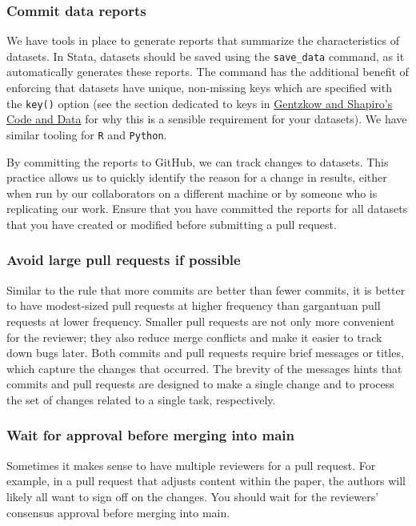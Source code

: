 \subsubsection{Commit data reports}
We have tools in place to generate reports that summarize the characteristics of datasets.
In Stata, datasets should be saved using the \texttt{save\_data} command,
as it automatically generates these reports.
The command has the additional benefit of enforcing that datasets have unique,
non-missing keys which are specified with the \texttt{key()} option
 (see the section dedicated to keys in \href{https://web.stanford.edu/~gentzkow/research/CodeAndData.pdf}{Gentzkow and Shapiro's Code and Data} for why this is a sensible requirement for your datasets).
We have similar tooling for \texttt{R} and \texttt{Python}.

By committing the reports to GitHub, we can track changes to datasets.
This practice allows us to quickly identify the reason for a change in results,
either when run by our collaborators on a different machine or by someone
who is replicating our work.
Ensure that you have committed the reports for all datasets
that you have created or modified before submitting a pull request.

\subsubsection{Avoid large pull requests if possible}
Similar to the rule that more commits are better than fewer commits,
it is better to have modest-sized pull requests at higher frequency
than gargantuan pull requests at lower frequency.
Smaller pull requests are not only more convenient for the reviewer;
they also reduce merge conflicts
and make it easier to track down bugs later.
Both commits and pull requests require brief messages or titles,
which capture the changes that occurred.
The brevity of the messages hints that commits and pull requests are designed
to make a single change and to process the set of changes related to a single task, respectively.

\subsubsection{Wait for approval before merging into main}
Sometimes it makes sense to have multiple reviewers for a pull request.
For example, in a pull request that adjusts content within the paper,
the authors will likely all want to sign off on the changes.
You should wait for the reviewers' consensus approval before merging into main.


